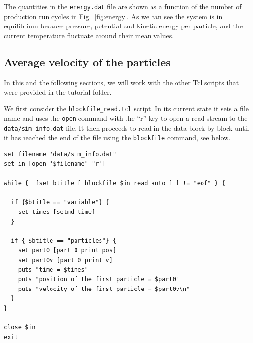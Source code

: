 \documentclass[
paper=a4,                       %
fontsize=11pt,                  %
twoside,                        %
footsepline,                    %
headsepline,                    %
headinclude=false,              %
footinclude=false,              %
pagesize,                       %
]{scrartcl}
\newtheorem{task}{Task}
\begin{document}
\noindent The quantities in the \texttt{energy.dat} file are shown as a function of the number of production run cycles in Fig.~\ref{fig:energy}. As we can see the system is in equilibrium because pressure, potential and kinetic energy per particle, and the current temperature fluctuate around their mean values.

\subsection{Average velocity of the particles}

In this and the following sections, we will work with the other Tcl scripts that were provided in the tutorial folder. 

\vspace{1cm}
\vspace{1cm}

We first consider the \texttt{blockfile\_read.tcl} script. In its current state it sets a file name and uses the \lstinline|open| command with the ``r'' key to open a read stream to the \texttt{data/sim\_info.dat} file. It then proceeds to read in the data block by block until it has reached the end of the file using the \lstinline|blockfile| command, see below.

{\small\vspace{0,2cm}
\begin{lstlisting}[numbers=none]
set filename "data/sim_info.dat"
set in [open "$filename" "r"]

while {  [set btitle [ blockfile $in read auto ] ] != "eof" } {

  if {$btitle == "variable"} {
    set times [setmd time]
  }

  if { $btitle == "particles"} {
    set part0 [part 0 print pos]
    set part0v [part 0 print v]
    puts "time = $times"
    puts "position of the first particle = $part0"
    puts "velocity of the first particle = $part0v\n"
  }
}

close $in
exit
\end{lstlisting}\vspace{0,2cm}
}
\end{document}
